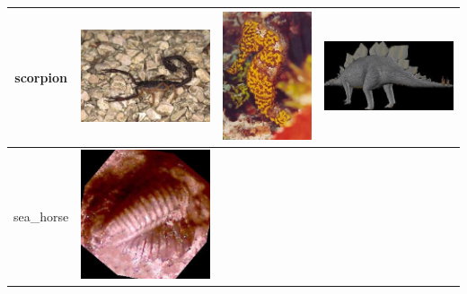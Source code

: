 \documentclass{article}
\begin{document}
\begin{table}[Ht]
\begin{tabular}{| c | c | c | c |}
\hline
scorpion &
\vspace{0cm}\includegraphics[scale=.1]{"Figures/Best Matches/bestmatch_c3"} &
\vspace{0cm}\includegraphics[scale=.1]{"Figures/False Matches/class_3_most_sure_wrong"} &
\vspace{0cm}\includegraphics[scale=.1]{"Figures/False Matches/class_3_least_sure_wrong"} \\
\hline
sea\_horse &
\vspace{0cm}\includegraphics[scale=.1]{"Figures/Best Matches/bestmatch_c4"} &

\end{tabular}
\end{table}
\end{document}
